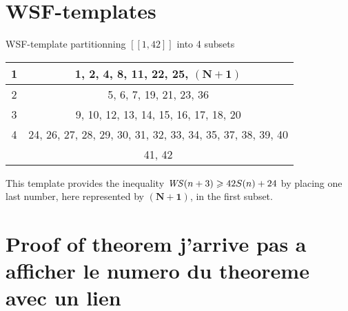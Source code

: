 \begin{center}
\begin{tabular}{|*{2}{c|}}
\end{tabular}
\end{center}


\section{WSF-templates}

\begin{center}
WSF-template partitionning \([\![1, 42]\!]\) into 4 subsets
\begin{tabular}{|*{2}{c|}}
	\hline
	1 & 1, 2, 4, 8, 11, 22, 25, \(\mathbf{(N+1)}\)\\
	\hline
	2 & 5, 6, 7, 19, 21, 23, 36\\
	\hline
	3 & 9, 10, 12, 13, 14, 15, 16, 17, 18, 20\\
	\hline
	4 & 24, 26, 27, 28, 29, 30, 31, 32, 33, 34, 35, 37, 38, 39, 40\\
	& 41, 42\\
	\hline
\end{tabular}
\end{center}

This template provides the inequality \(\mathit{WS} (n+3) \geqslant 42S(n) + 24\)
by placing one last number, here represented by \(\mathbf{(N+1)}\), in the first subset.


\section{Proof of theorem j'arrive pas a afficher le numero du theoreme avec un lien}

